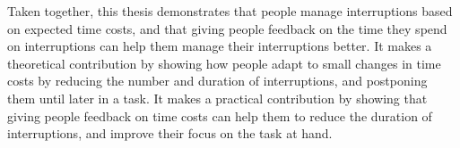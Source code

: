 
Taken together, this thesis demonstrates that people manage interruptions based on expected time costs, and that giving people feedback on the time they spend on interruptions can help them manage their interruptions better. It makes a theoretical contribution by showing how people adapt to small changes in time costs by reducing the number and duration of interruptions, and postponing them until later in a task. It makes a practical contribution by showing that giving people feedback on time costs can help them to reduce the duration of interruptions, and improve their focus on the task at hand. 